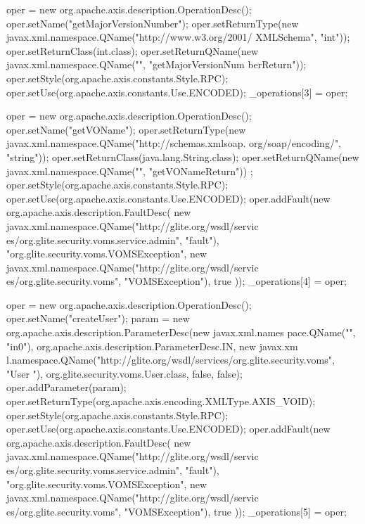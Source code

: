 \begin{DoxyCode}
{        oper = new org.apache.axis.description.OperationDesc();
        oper.setName("getMajorVersionNumber");
        oper.setReturnType(new javax.xml.namespace.QName("http://www.w3.org/2001/
      XMLSchema", "int"));
        oper.setReturnClass(int.class);
        oper.setReturnQName(new javax.xml.namespace.QName("", "getMajorVersionNum
      berReturn"));
        oper.setStyle(org.apache.axis.constants.Style.RPC);
        oper.setUse(org.apache.axis.constants.Use.ENCODED);
        _operations[3] = oper;

        oper = new org.apache.axis.description.OperationDesc();
        oper.setName("getVOName");
        oper.setReturnType(new javax.xml.namespace.QName("http://schemas.xmlsoap.
      org/soap/encoding/", "string"));
        oper.setReturnClass(java.lang.String.class);
        oper.setReturnQName(new javax.xml.namespace.QName("", "getVONameReturn"))
      ;
        oper.setStyle(org.apache.axis.constants.Style.RPC);
        oper.setUse(org.apache.axis.constants.Use.ENCODED);
        oper.addFault(new org.apache.axis.description.FaultDesc(
                      new javax.xml.namespace.QName("http://glite.org/wsdl/servic
      es/org.glite.security.voms.service.admin", "fault"),
                      "org.glite.security.voms.VOMSException",
                      new javax.xml.namespace.QName("http://glite.org/wsdl/servic
      es/org.glite.security.voms", "VOMSException"), 
                      true
                     ));
        _operations[4] = oper;

        oper = new org.apache.axis.description.OperationDesc();
        oper.setName("createUser");
        param = new org.apache.axis.description.ParameterDesc(new javax.xml.names
      pace.QName("", "in0"), org.apache.axis.description.ParameterDesc.IN, new javax.xm
      l.namespace.QName("http://glite.org/wsdl/services/org.glite.security.voms", "User
      "), org.glite.security.voms.User.class, false, false);
        oper.addParameter(param);
        oper.setReturnType(org.apache.axis.encoding.XMLType.AXIS_VOID);
        oper.setStyle(org.apache.axis.constants.Style.RPC);
        oper.setUse(org.apache.axis.constants.Use.ENCODED);
        oper.addFault(new org.apache.axis.description.FaultDesc(
                      new javax.xml.namespace.QName("http://glite.org/wsdl/servic
      es/org.glite.security.voms.service.admin", "fault"),
                      "org.glite.security.voms.VOMSException",
                      new javax.xml.namespace.QName("http://glite.org/wsdl/servic
      es/org.glite.security.voms", "VOMSException"), 
                      true
                     ));
        _operations[5] = oper;

}
\end{DoxyCode}
